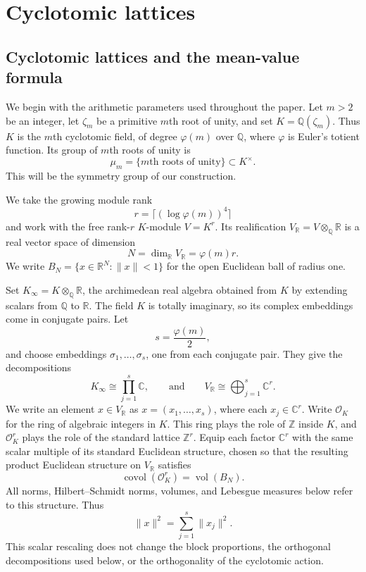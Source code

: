 \documentclass[11pt]{article}
\theoremstyle{remark}
\newcommand{\R}{\mathbb R}
\newcommand{\C}{\mathbb C}
\newcommand{\Q}{\mathbb Q}
\newcommand{\Z}{\mathbb Z}
\newcommand{\OK}{\mathcal O_K}
\newcommand{\vol}{\operatorname{vol}}
\newcommand{\covol}{\operatorname{covol}}
\begin{document}
\section{Cyclotomic lattices}\label{sec:cyclotomic}

\subsection{Cyclotomic lattices and the mean-value formula}

We begin with the arithmetic parameters used throughout the paper.  Let $m>2$
be an integer, let $\zeta_m$ be a primitive $m$th root of unity, and set
$K=\Q(\zeta_m)$.
Thus $K$ is the $m$th cyclotomic field, of degree $\varphi(m)$ over $\Q$,
where $\varphi$ is Euler's totient function.  Its group of $m$th roots of
unity is
\[
        \mu_m=\{\text{$m$th roots of unity}\}\subset K^\times.
\]
This will be the symmetry group of our construction.

We take the growing module rank
\[
        r=\lceil(\log\varphi(m))^4\rceil
\]
and work with the free rank-$r$ $K$-module $V=K^r$.  Its realification
$V_\R=V\otimes_\Q\R$ is a real vector space of dimension
\[
        N=\dim_\R V_\R=\varphi(m)r.
\]
We write $B_N=\{x\in\R^N:\|x\|<1\}$ for the open Euclidean ball of radius
one.

Set $K_\infty=K\otimes_\Q\R$, the archimedean real algebra obtained from $K$
by extending scalars from $\Q$ to $\R$.  The field $K$ is totally imaginary,
so its complex embeddings come in conjugate pairs.  Let
\[
        s=\frac{\varphi(m)}2,
\]
and choose embeddings $\sigma_1,\dots,\sigma_s$, one from each conjugate pair.
They give the decompositions
\[
        K_\infty\cong\prod_{j=1}^s\C,
        \qquad\text{and}\qquad
        V_\R\cong\bigoplus_{j=1}^s\C^r.
\]
We write an element $x\in V_\R$ as $x=(x_1,\dots,x_s)$, where each
$x_j\in\C^r$.  Write $\OK$ for the ring of algebraic integers in $K$.  This
ring plays the role of $\Z$ inside $K$, and $\OK^r$ plays the role of the
standard lattice $\Z^r$.
Equip each factor $\C^r$ with the same scalar multiple of its standard
Euclidean structure, chosen so that the resulting product Euclidean structure
on $V_\R$ satisfies
\[
        \covol(\OK^r)=\vol(B_N).
\]
All norms, Hilbert--Schmidt norms, volumes, and Lebesgue measures below refer
to this structure.  Thus
\[
        \|x\|^2=\sum_{j=1}^s\|x_j\|^2.
\]
This scalar rescaling does not change the block proportions, the orthogonal
decompositions used below, or the orthogonality of the cyclotomic action.
\end{document}
